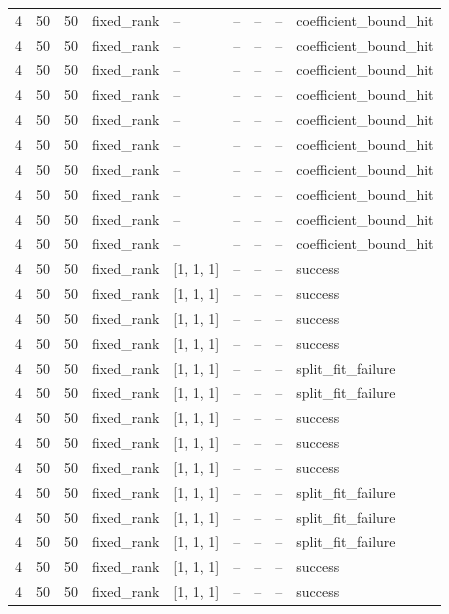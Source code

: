 \begin{longtable}{lllllllll}
4 & 50 & 50 & fixed\_rank & -- & -- & -- & -- & coefficient\_bound\_hit \\
4 & 50 & 50 & fixed\_rank & -- & -- & -- & -- & coefficient\_bound\_hit \\
4 & 50 & 50 & fixed\_rank & -- & -- & -- & -- & coefficient\_bound\_hit \\
4 & 50 & 50 & fixed\_rank & -- & -- & -- & -- & coefficient\_bound\_hit \\
4 & 50 & 50 & fixed\_rank & -- & -- & -- & -- & coefficient\_bound\_hit \\
4 & 50 & 50 & fixed\_rank & -- & -- & -- & -- & coefficient\_bound\_hit \\
4 & 50 & 50 & fixed\_rank & -- & -- & -- & -- & coefficient\_bound\_hit \\
4 & 50 & 50 & fixed\_rank & -- & -- & -- & -- & coefficient\_bound\_hit \\
4 & 50 & 50 & fixed\_rank & -- & -- & -- & -- & coefficient\_bound\_hit \\
4 & 50 & 50 & fixed\_rank & -- & -- & -- & -- & coefficient\_bound\_hit \\
4 & 50 & 50 & fixed\_rank & [1, 1, 1] & -- & -- & -- & success \\
4 & 50 & 50 & fixed\_rank & [1, 1, 1] & -- & -- & -- & success \\
4 & 50 & 50 & fixed\_rank & [1, 1, 1] & -- & -- & -- & success \\
4 & 50 & 50 & fixed\_rank & [1, 1, 1] & -- & -- & -- & success \\
4 & 50 & 50 & fixed\_rank & [1, 1, 1] & -- & -- & -- & split\_fit\_failure \\
4 & 50 & 50 & fixed\_rank & [1, 1, 1] & -- & -- & -- & split\_fit\_failure \\
4 & 50 & 50 & fixed\_rank & [1, 1, 1] & -- & -- & -- & success \\
4 & 50 & 50 & fixed\_rank & [1, 1, 1] & -- & -- & -- & success \\
4 & 50 & 50 & fixed\_rank & [1, 1, 1] & -- & -- & -- & success \\
4 & 50 & 50 & fixed\_rank & [1, 1, 1] & -- & -- & -- & split\_fit\_failure \\
4 & 50 & 50 & fixed\_rank & [1, 1, 1] & -- & -- & -- & split\_fit\_failure \\
4 & 50 & 50 & fixed\_rank & [1, 1, 1] & -- & -- & -- & split\_fit\_failure \\
4 & 50 & 50 & fixed\_rank & [1, 1, 1] & -- & -- & -- & success \\
4 & 50 & 50 & fixed\_rank & [1, 1, 1] & -- & -- & -- & success \\

\end{longtable}
